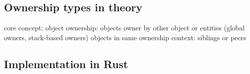 \documentclass[sigplan,11pt,nonacm]{acmart}
\begin{document}
\subsection{Ownership types in theory}


core concept: object ownership: objects owner by other object or entities (global owners, stack-based owners)
objects in same ownership context: siblings or peers


\subsection{Implementation in Rust}


\end{document}
